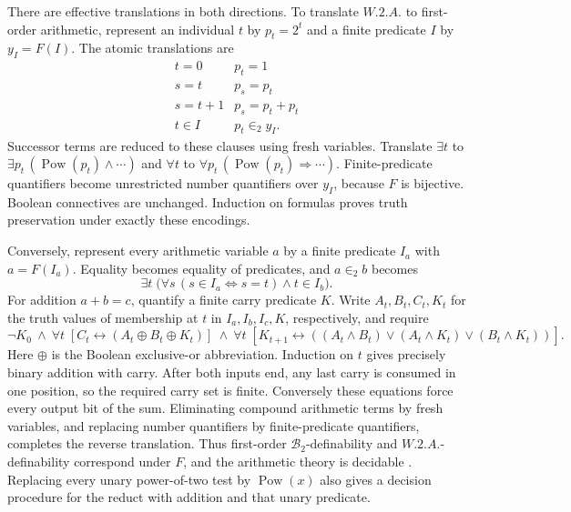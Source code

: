 There are effective translations in both directions.  To translate
\(W.2.A.\) to first-order arithmetic, represent an individual \(t\) by
\(p_t=2^t\) and a finite predicate \(I\) by \(y_I=F(I)\).  The atomic
translations are
\[
 \begin{array}{c|c}
 t=0&p_t=1\\
 s=t&p_s=p_t\\
 s=t+1&p_s=p_t+p_t\\
 t\in I&p_t\in_2y_I.
 \end{array}
\]
Successor terms are reduced to these clauses using fresh variables.
Translate \(\exists t\) to \(\exists p_t\,(\operatorname{Pow}(p_t)\land\cdots)\)
and \(\forall t\) to
\(\forall p_t\,(\operatorname{Pow}(p_t)\Rightarrow\cdots)\).
Finite-predicate quantifiers become unrestricted number quantifiers over
\(y_I\), because \(F\) is bijective.  Boolean connectives are unchanged.
Induction on formulas proves truth preservation under exactly these encodings.

Conversely, represent every arithmetic variable \(a\) by a finite predicate
\(I_a\) with \(a=F(I_a)\).  Equality becomes equality of predicates, and
\(a\in_2b\) becomes
\[
 \exists t\;
 \bigl(\forall s\,(s\in I_a\Longleftrightarrow s=t)\land t\in I_b\bigr).
\]
For addition \(a+b=c\), quantify a finite carry predicate \(K\).  Write
\(A_t,B_t,C_t,K_t\) for the truth values of membership at \(t\) in
\(I_a,I_b,I_c,K\), respectively, and require
\[
 \neg K_0\ \land\ \forall t\;
 \left[
  C_t\longleftrightarrow(A_t\mathbin{\oplus}B_t\mathbin{\oplus}K_t)
 \right]
 \ \land\ \forall t\;
 \left[
  K_{t+1}\longleftrightarrow
      ((A_t\land B_t)\lor(A_t\land K_t)\lor(B_t\land K_t))
 \right].
\]
Here \(\oplus\) is the Boolean exclusive-or abbreviation.  Induction on
\(t\) gives precisely binary addition with carry.  After both inputs end,
any last carry is consumed in one position, so the required carry set is
finite.  Conversely these equations force every output bit of the sum.
Eliminating compound arithmetic terms by fresh variables, and replacing
number quantifiers by finite-predicate quantifiers, completes the reverse
translation.  Thus first-order \(\mathcal B_2\)-definability and
\(W.2.A.\)-definability correspond under \(F\), and the arithmetic theory
is decidable \cite[pp.~202--203]{BruyereEtAl1994}.
Replacing every unary power-of-two test by \(\operatorname{Pow}(x)\)
also gives a decision procedure for the reduct with addition and that
unary predicate.

